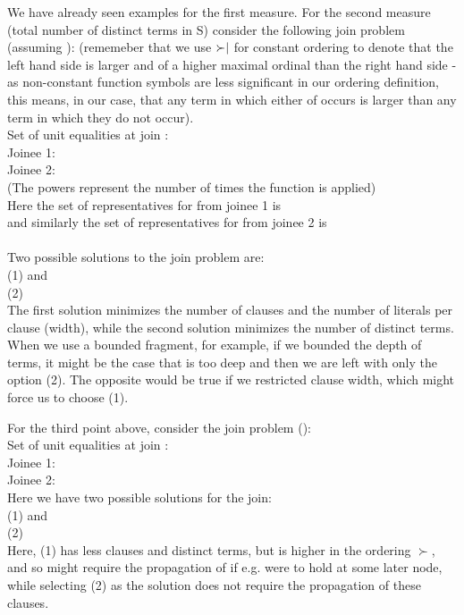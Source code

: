 We have already seen examples for the first measure.
For the second measure (total number of distinct terms in S) consider the following join problem (assuming ):
(rememeber that we use $\succ\mid$ for constant ordering to denote that the left hand side is larger and of a higher maximal ordinal than the right hand side - as non-constant function symbols are less significant in our ordering definition, this means, in our case, that any term in which either of  occurs is larger than any term in which they do not occur).\\
Set of unit equalities at join : \m{\emptyset}\\
Joinee 1: \\
Joinee 2: \\
(The powers represent the number of times the function is applied)\\
Here the set of representatives for  from joinee 1 is \\
and similarly the set of representatives for  from joinee 2 is \\
\\
Two possible solutions to the join problem are:\\
(1)  and\\
(2) \\
The first solution minimizes the number of clauses and the number of literals per clause (width), while the second solution minimizes the number of distinct terms.
When we use a bounded fragment, for example, if we bounded the depth of terms, it might be the case that  is too deep and then we are left with only the option (2). The opposite would be true if we restricted clause width, which might force us to choose (1).

For the third point above, consider the join problem ():\\
Set of unit equalities at join : \m{\emptyset}\\
Joinee 1: \\
Joinee 2: \\
Here we have two possible solutions for the join:\\
(1)  and \\
(2) \\
Here, (1) has less clauses and distinct terms, but is higher in the ordering $\succ$, 
and so might require the propagation of  if e.g.  were to hold at some later node, 
while selecting (2) as the solution does not require the propagation of these clauses.

